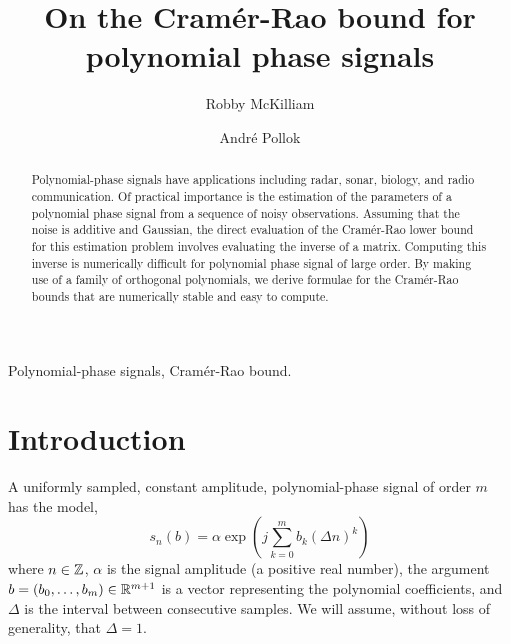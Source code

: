 \documentclass[review]{elsarticle}
\begin{document}
\begin{frontmatter}

\title{On the Cram\'{e}r-Rao bound for polynomial phase signals}

\author{Robby McKilliam} 
\author{Andr\'{e} Pollok}
\address{Institute for Telecommunications Research, The University of South Australia, SA, 5095}

 


\begin{abstract}
Polynomial-phase signals have applications including radar, sonar, biology, and radio communication.  Of practical importance is the estimation of the parameters of a polynomial phase signal from a sequence of noisy observations.  Assuming that the noise is additive and Gaussian, the direct evaluation of the Cram\'{e}r-Rao lower bound for this estimation problem involves evaluating the inverse of a matrix.  Computing this inverse is numerically difficult for polynomial phase signal of large order.  By making use of a family of orthogonal polynomials, we derive formulae for the Cram\'{e}r-Rao bounds that are numerically stable and easy to compute.
\end{abstract}

\begin{keyword}
Polynomial-phase signals, Cram\'{e}r-Rao bound.
\end{keyword}


\end{frontmatter}

\section{Introduction}

A uniformly sampled, constant amplitude, polynomial-phase signal of order $m$ has the model,
\begin{equation}\label{eq:polyestfunction}
s_n(b) = \alpha \exp\left( j \sum_{k = 0}^{m}{b_k (\Delta n)^k}\right)
\end{equation}
where $n \in {\mathbb Z}$, $\alpha$ is the signal amplitude (a positive real number), the argument $b=(b_0, \dots, b_m)\in{\mathbb R}^{m+1}$ is a vector representing the polynomial coefficients,  and $\Delta$ is the interval between consecutive samples.  We will assume, without loss of generality, that $\Delta = 1$.
\end{document}
